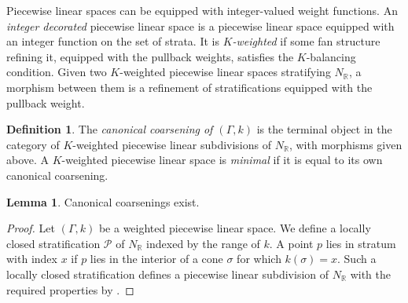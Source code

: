 \documentclass[11pt]{amsart}
\theoremstyle{definition}
\theoremstyle{definition}
\newtheorem{lemma}[theorem]{Lemma}
\newtheorem{definition}[theorem]{Definition}
\newcommand{\RR}{\mathbb{R}}
\begin{document}
Piecewise linear spaces can be equipped with integer-valued weight functions. An {\it integer decorated} piecewise linear space is a piecewise linear space equipped with an integer function on the set of strata. It is {\it $K$-weighted} if some fan structure refining it, equipped with the pullback weights, satisfies the $K$-balancing condition. Given two $K$-weighted piecewise linear spaces stratifying $N_\RR$, a morphism between them is a refinement of stratifications equipped with the pullback weight. 

\begin{definition}
The {\it canonical coarsening of $(\Gamma,k)$} is the terminal object in the category of $K$-weighted piecewise linear subdivisions of $N_\RR$, with morphisms given above. A $K$-weighted piecewise linear space is {\it minimal} if it is equal to its own canonical coarsening. 
\end{definition} 

\begin{lemma}
Canonical coarsenings exist.
\end{lemma}

\begin{proof}
Let $(\Gamma,k)$ be a weighted piecewise linear space. We define a locally closed stratification $\mathcal{P}$ of $N_\mathbb{R}$ indexed by the range of $k$. A point $p$ lies in stratum with index $x$ if $p$ lies in the interior of a cone $\sigma$ for which $k(\sigma) = x$. Such a locally closed stratification defines a piecewise linear subdivision of $N_\mathbb{R}$ with the required properties by \cite[Proposition 1.2.5]{Logquot}.
\end{proof}
\end{document}
